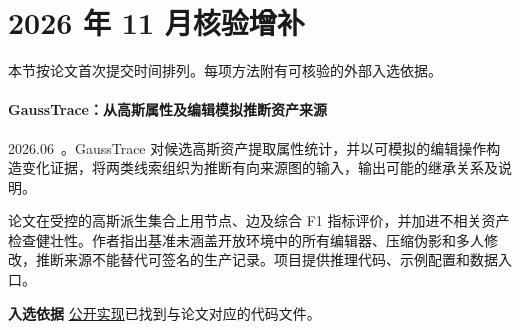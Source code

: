 \section{2026 年 11 月核验增补}

本节按论文首次提交时间排列。每项方法附有可核验的外部入选依据。

\paragraph{GaussTrace：从高斯属性及编辑模拟推断资产来源}
2026.06~\cite{2606_10612}。GaussTrace 对候选高斯资产提取属性统计，并以可模拟的编辑操作构造变化证据，将两类线索组织为推断有向来源图的输入，输出可能的继承关系及说明。

论文在受控的高斯派生集合上用节点、边及综合 F1 指标评价，并加进不相关资产检查健壮性。作者指出基准未涵盖开放环境中的所有编辑器、压缩伪影和多人修改，推断来源不能替代可签名的生产记录。项目提供推理代码、示例配置和数据入口。

\textbf{入选依据} \href{https://github.com/haolianghan/gausstrace-code}{公开实现}已找到与论文对应的代码文件。
